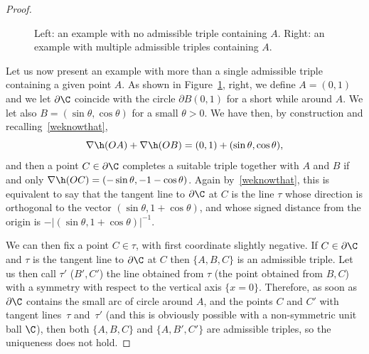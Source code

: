 \begin{proof}
\begin{figure}[htbp]
\caption{Left: an example with no admissible triple containing $A$. Right: an example with multiple admissible triples containing $A$.}\label{Fignonsymm}
\end{figure}
Let us now present an example with more than a single admissible triple containing a given point $A$. As shown in Figure~\ref{Fignonsymm}, right, we define $A=(0,1)$ and we let $\partial\C$ coincide with the circle $\partial B(0,1)$ for a short while around $A$. We let also $B=(\sin\theta,\cos\theta)$ for a small $\theta>0$. We have then, by construction and recalling~\eqref{weknowthat},
\[
\nabla \h(OA)+\nabla\h(OB)=(0,1) + (\sin\theta,\cos\theta),
\]
and then a point $C\in\partial\C$ completes a suitable triple together with $A$ and $B$ if and only $\nabla\h(OC)=(-\sin\theta,-1-\cos\theta)$. Again by~\eqref{weknowthat}, this is equivalent to say that the tangent line to $\partial\C$ at $C$ is the line $\tau$ whose direction is orthogonal to the vector $(\sin\theta,1+\cos\theta)$, and whose signed distance from the origin is $-\big|(\sin\theta,1+\cos\theta)\big|^{-1}$.\par
We can then fix a point $C\in \tau$, with first coordinate slightly negative. If $C\in\partial\C$ and $\tau$ is the tangent line to $\partial\C$ at $C$ then $\{A,B,C\}$ is an admissible triple. Let us then call $\tau'$ (\resp $B',C'$) the line obtained from $\tau$ (\resp the point obtained from $B,C$) with a symmetry with respect to the vertical axis $\{x=0\}$. Therefore, as soon as $\partial\C$ contains the small arc of circle around $A$, and the points $C$ and $C'$ with tangent lines~$\tau$ and~$\tau'$ (and this is obviously possible with a non-symmetric unit ball $\C$), then both $\{A,B,C\}$ and $\{A,B',C'\}$ are admissible triples, so the uniqueness does not hold.
\end{proof}

